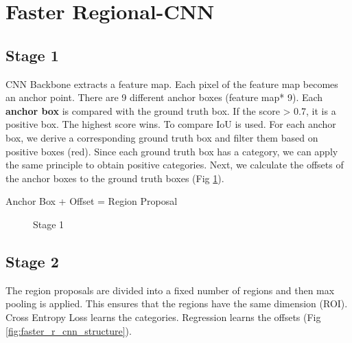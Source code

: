 \section{Faster Regional-CNN}
\subsection{Stage 1}
CNN Backbone extracts a feature map. Each pixel of the feature map becomes an anchor point. There are 9 different anchor boxes (feature map* 9). Each \textbf{anchor box} is compared with the ground truth box. If the score \textgreater{} 0.7, it is a positive box. The highest score wins. To compare IoU is used.
For each anchor box, we derive a corresponding ground truth box and filter them based on positive boxes (red). Since each ground truth box has a category, we can apply the same principle to obtain positive categories. Next, we calculate the offsets of the anchor boxes to the ground truth boxes (Fig \ref{fig:faster_r_cnn_stage_1}).

Anchor Box + Offset = Region Proposal

\begin{figure}[ht]
  \centering
  \hfill
  \caption{Stage 1}
  \label{fig:faster_r_cnn_stage_1}
\end{figure}

\subsection{Stage 2}

The region proposals are divided into a fixed number of regions and then max pooling is applied. This ensures that the regions have the same dimension (ROI). Cross Entropy Loss learns the categories. Regression learns the offsets (Fig \ref{fig:faster_r_cnn_structure}).

